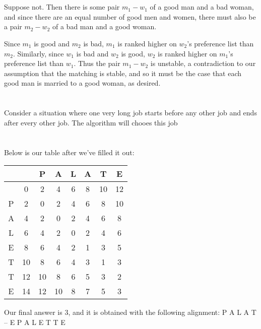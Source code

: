 \documentclass[11pt]{article}
\begin{document}
\renewcommand{\thesubsection}{\thesection.\alph{subsection}}
\section{} %
Suppose not.
Then there is some pair $m_1 - w_1$ of a good man and a bad woman, and since there are an equal number of good men and women, there must also be a pair $m_2 - w_2$ of a bad man and a good woman.

Since $m_1$ is good and $m_2$ is bad, $m_1$ is ranked higher on $w_2$'s preference list than $m_2$.
Similarly, since $w_1$ is bad and $w_2$ is good, $w_2$ is ranked higher on $m_1$'s preference list than $w_1$.
Thus the pair $m_1 - w_2$ is unstable, a contradiction to our assumption that the matching is stable, and so it must be the case that each good man is married to a good woman, as desired.


\section{} %
\subsection{} %
Consider a situation where one very long job starts before any other job and ends after every other job.
The algorithm will chooes this job


\subsection{} %


\section{} %


\section{} %
Below is our table after we've filled it out:
\begin{center}
\renewcommand{\arraystretch}{1.6}
\begin{tabular}{| c |c |c |c |c |c |c | c |}
	\hline
	  &   & P & A & L & A & T & E \\ \hline
	  & 0 & 2 & 4 & 6 & 8 & 10 & 12 \\ \hline
	P & 2 & 0 & 2 & 4 & 6 & 8 & 10 \\ \hline
	A & 4 & 2 & 0 & 2 & 4 & 6 & 8 \\ \hline
	L & 6 & 4 & 2 & 0 & 2 & 4 & 6 \\ \hline
	E & 8 & 6 & 4 & 2 & 1 & 3 & 5 \\ \hline
	T & 10 & 8 & 6 & 4 & 3 & 1 & 3 \\ \hline
	T & 12 & 10 & 8 & 6 & 5 & 3 & 2 \\ \hline
	E & 14 & 12 & 10 & 8 & 7 & 5 & 3 \\ \hline
\end{tabular}
\end{center}
Our final answer is 3, and it is obtained with the following alignment:
\newline
P A L A T -- E
\newline
P A L E T T E
\end{document}
